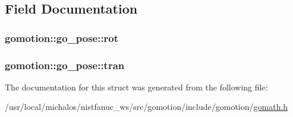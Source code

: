 \subsection{Field Documentation}
\hypertarget{structgomotion_1_1go__pose_af30134c2f4d702ec890ec6726051cf8e}{
\subsubsection[{rot}]{ gomotion\-::go\-\_\-pose\-::rot}}\label{structgomotion_1_1go__pose_af30134c2f4d702ec890ec6726051cf8e}
\hypertarget{structgomotion_1_1go__pose_afbe37cf24135dfc3cadf3536e88d7e8e}{
\subsubsection[{tran}]{ gomotion\-::go\-\_\-pose\-::tran}}\label{structgomotion_1_1go__pose_afbe37cf24135dfc3cadf3536e88d7e8e}


The documentation for this struct was generated from the following file\-:\begin{DoxyCompactItemize}
\item 
/usr/local/michalos/nistfanuc\-\_\-ws/src/gomotion/include/gomotion/\hyperlink{gomath_8h}{gomath.\-h}\end{DoxyCompactItemize}

